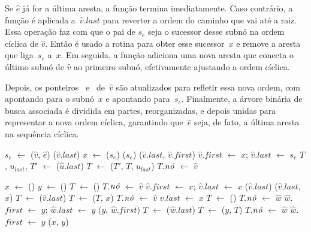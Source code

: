 Se $\hat e$ já for a última aresta, a função termina imediatamente.
Caso contrário, a função \linkcutEvert{} é aplicada a~$\hat v$.$last$ para reverter a ordem do caminho que vai até a raiz.
Essa operação faz com que o pai de $s_e$ seja o sucessor desse subnó na ordem cíclica de $\hat v$.
Então é usado a rotina \linkcutParent{} para obter esse sucessor~$x$ e remove a aresta que liga~$s_e$ a~$x$.
Em seguida, a função \linkcutAddEdge adiciona uma nova aresta que conecta o último subnó de $\hat v$ ao primeiro subnó, efetivamente ajustando a ordem cíclica.

Depois, os ponteiros~ e~ de~$\hat v$ são atualizados para refletir essa nova ordem, com  apontando para o subnó~$x$ e  apontando para~$s_e$.
Finalmente, a árvore binária de busca associada é dividida em partes, reorganizadas, e depois unidas para representar a nova ordem cíclica, garantindo que~$\hat e$ seja, de fato, a última aresta na sequência cíclica.




\begin{algorithm}[htb]
\caption{\LCOCycle($\hat v$, $\hat e$)}
\label{Algo:LCOCycle}
\begin{algorithmic}[1]
\State $s_e$ $\gets$ \LCOFindSubNode($\hat v$, $\hat e$)
\State\Return
\EndIf
\State \linkcutEvert($\hat v$.$last$)
\State $x$ $\gets$ \linkcutParent($s_e$)
\State \linkcutDelEdge($s_e$)
\State \linkcutAddEdge($\hat v$.$last$, $\hat v$.$first$)
\State $\hat v$.$first$ $\gets$ $x$; $\hat v$.$last$ $\gets$ $s_e$
\State $T$, $u_{last}$, $T'$ $\gets$ \treapSplit($\hat u$.$last$)
\State $T$ $\gets$ \treapJoin($T'$, $T$, $u_{last}$)
\State $T$.$\mathit{n\acute{o}}$ $\gets$ $\hat v$
\end{algorithmic}
\end{algorithm}


\begin{algorithm}[htb]
\caption{\LCOLink($\hat v$, $\hat w$)}
\label{Algo:LCOLink}
\begin{algorithmic}[1]
\State $x$ $\gets$ \linkcutCreate()
\State $y$ $\gets$ \linkcutCreate()
  \State $T$ $\gets$ \treapCreate()
  \State $T$.$\mathit{n\acute{o}}$ $\gets$ $\hat v$
  \State $\hat v$.$first$ $\gets$ $x$; $\hat v$.$last$ $\gets$ $x$ 
\Else
  \State \linkcutEvert($\hat v$.$last$)
  \State \linkcutAddEdge($\hat v$.$last$, $x$)
  \State $T$ $\gets$ \treapGetRoot($\hat v$.$last$)
  \State $T$ $\gets$ \treapJoin($T$, $x$)
  \State $T$.$\mathit{n\acute{o}}$ $\gets$ $\hat v$
  \State $\hat v$.$last$ $\gets$ $x$
\EndIf
{}
  \State $T$ $\gets$ \treapCreate()
  \State $T$.$\mathit{n\acute{o}}$ $\gets$ $\hat w$
  \State $\hat w$.$first$ $\gets$ $y$; $\hat w$.$last$ $\gets$ $y$ 
\Else
  \State \linkcutAddEdge($y$, $\hat w$.$first$)
  \State $T$ $\gets$ \treapGetRoot($\hat w$.$last$)
  \State $T$ $\gets$ \treapJoin($y$, $T$)
  \State $T$.$\mathit{n\acute{o}}$ $\gets$ $\hat w$
  \State $\hat w$.$first$ $\gets$ $y$
\EndIf
\State \linkcutAddEdge($x$, $y$)
\end{algorithmic}
\end{algorithm}

